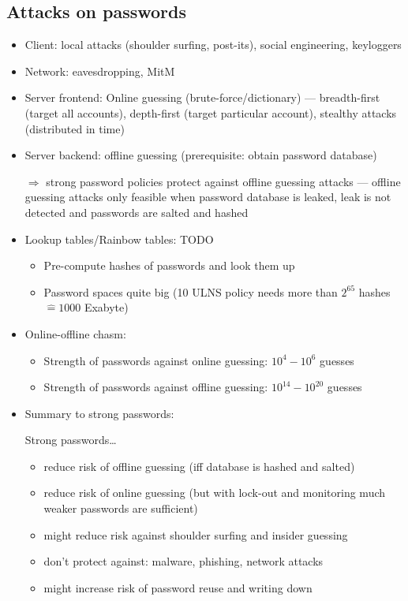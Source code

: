 \documentclass[a4paper,12pt]{scrartcl}
\begin{document}
\subsection{Attacks on passwords}
\begin{itemize}
	\item
		Client: local attacks (shoulder surfing, post-its), social engineering, keyloggers
	\item
		Network:
		eavesdropping, MitM
	\item
		Server frontend: Online guessing (brute-force/dictionary) --- breadth-first (target all accounts), depth-first (target particular account), stealthy attacks (distributed in time)
	\item
		Server backend: offline guessing (prerequisite: obtain password database)
	\item[$\Rightarrow$] strong password policies protect against offline guessing attacks --- offline guessing attacks only feasible when password database is leaked, leak is not detected and passwords are salted and hashed
	\item
		Lookup tables/Rainbow tables: TODO
		\begin{itemize}
			\item
				Pre-compute hashes of passwords and look them up
			\item
				Password spaces quite big (10 ULNS policy needs more than $2^{65}$ hashes $ \mathrel{\widehat{=}} 1000$ Exabyte)
		\end{itemize}
	\item
		Online-offline chasm:
		\begin{itemize}
			\item
				Strength of passwords against online guessing: $10^4 - 10^6$ guesses
			\item
				Strength of passwords against offline guessing: $10^{14} - 10^{20}$ guesses
		\end{itemize}
		
	\item
		Summary to strong passwords:

		Strong passwords\dots
		\begin{itemize}
			\item
				reduce risk of offline guessing (iff database is hashed and salted)
			\item
				reduce risk of online guessing (but with lock-out and monitoring much weaker passwords are sufficient)
			\item
				might reduce risk against shoulder surfing and insider guessing
			\item
				don't protect against: malware, phishing, network attacks
			\item
				might increase risk of password reuse and writing down
		\end{itemize}
\end{itemize}
\end{document}
